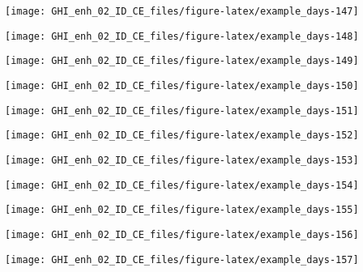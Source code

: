 \documentclass[
  10pt,
  a4paper,oneside]{article}
\begin{document}
\begin{center}\texttt{[image: GHI\_enh\_02\_ID\_CE\_files/figure-latex/example\_days-147]} \end{center}

\begin{center}\texttt{[image: GHI\_enh\_02\_ID\_CE\_files/figure-latex/example\_days-148]} \end{center}

\begin{center}\texttt{[image: GHI\_enh\_02\_ID\_CE\_files/figure-latex/example\_days-149]} \end{center}

\begin{center}\texttt{[image: GHI\_enh\_02\_ID\_CE\_files/figure-latex/example\_days-150]} \end{center}

\begin{center}\texttt{[image: GHI\_enh\_02\_ID\_CE\_files/figure-latex/example\_days-151]} \end{center}

\begin{center}\texttt{[image: GHI\_enh\_02\_ID\_CE\_files/figure-latex/example\_days-152]} \end{center}

\begin{center}\texttt{[image: GHI\_enh\_02\_ID\_CE\_files/figure-latex/example\_days-153]} \end{center}

\begin{center}\texttt{[image: GHI\_enh\_02\_ID\_CE\_files/figure-latex/example\_days-154]} \end{center}

\begin{center}\texttt{[image: GHI\_enh\_02\_ID\_CE\_files/figure-latex/example\_days-155]} \end{center}

\begin{center}\texttt{[image: GHI\_enh\_02\_ID\_CE\_files/figure-latex/example\_days-156]} \end{center}

\begin{center}\texttt{[image: GHI\_enh\_02\_ID\_CE\_files/figure-latex/example\_days-157]} \end{center}
\end{document}
